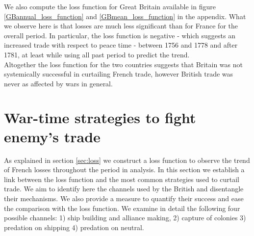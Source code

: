 \documentclass[12pt,a4paper,notitlepage,english]{article}
\begin{document}
We also compute the loss function for Great Britain available in figure \ref{GBannual_loss_function} and \ref{GBmean_loss_function} in the appendix. What we observe here is that losses are much less significant than for France for the overall period. In particular, the loss function is negative - which suggests an increased trade with respect to peace time - between 1756 and 1778 and after 1781, at least while using all past period to predict the trend. \\
Altogether the loss function for the two countries suggests that Britain was not systemically successful in curtailing French trade, however British trade was never as affected by wars in general.  

\section{War-time strategies to fight enemy's trade}
\label{sec:wartime_strategies}
As explained in section \ref{sec:loss} we construct a loss function to observe the trend of French losses throughout the period in analysis. In this section we establish a link between the loss function and the most common strategies used to curtail trade. We aim to identify here the channels used by the British and disentangle their mechanisms. We also provide a measure to quantify their success and ease the comparison with the loss function. We examine in detail the following four possible channels: 1) ship building and alliance making, 2) capture of colonies 3) predation on shipping 4) predation on neutral.  
\end{document}
